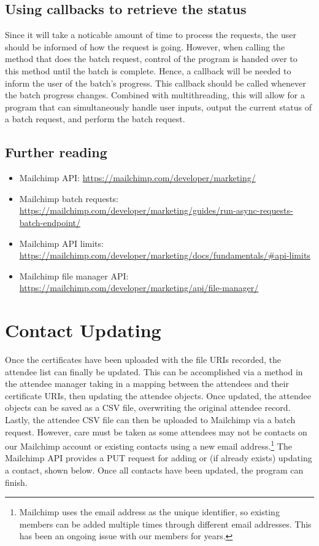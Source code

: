 \documentclass[11pt]{article}
\begin{document}
\subsection{Using callbacks to retrieve the status}

Since it will take a noticable amount of time to process the requests, the user should be informed of how the request is going. However, when calling the method that does the batch request, control of the program is handed over to this method until the batch is complete. Hence, a callback will be needed to inform the user of the batch's progress. This callback should be called whenever the batch progress changes. Combined with multithreading, this will allow for a program that can simultaneously handle user inputs, output the current status of a batch request, and perform the batch request.

\subsection{Further reading}

\begin{itemize}
    \item Mailchimp API: \url{https://mailchimp.com/developer/marketing/}
    \item Mailchimp batch requests: \url{https://mailchimp.com/developer/marketing/guides/run-async-requests-batch-endpoint/}
    \item Mailchimp API limits: \url{https://mailchimp.com/developer/marketing/docs/fundamentals/#api-limits}
    \item Mailchimp file manager API: \url{https://mailchimp.com/developer/marketing/api/file-manager/}
\end{itemize}

\newpage

\section{Contact Updating}

Once the certificates have been uploaded with the file URIs recorded, the attendee list can finally be updated. This can be accomplished via a method in the attendee manager taking in a mapping between the attendees and their certificate URIs, then updating the attendee objects. Once updated, the attendee objects can be saved as a CSV file, overwriting the original attendee record. Lastly, the attendee CSV file can then be uploaded to Mailchimp via a batch request. However, care must be taken as some attendees may not be contacts on our Mailchimp account or existing contacts using a new email address.\footnote{Mailchimp uses the email address as the unique identifier, so existing members can be added multiple times through different email addresses. This has been an ongoing issue with our members for years.} The Mailchimp API provides a PUT request for adding or (if already exists) updating a contact, shown below. Once all contacts have been updated, the program can finish.
\end{document}
